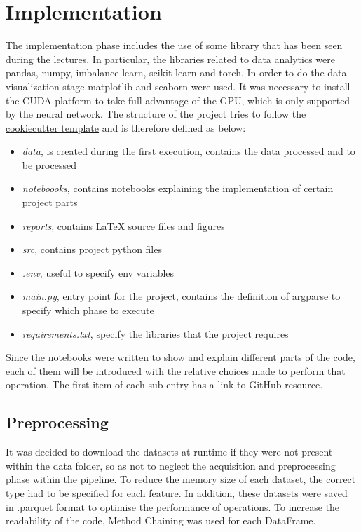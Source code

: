 \documentclass[../main]{subfiles}
\begin{document}
\chapter{Implementation}
The implementation phase includes the use of some library that has been seen during the lectures.
In particular, the libraries related to data analytics were pandas, numpy, imbalance-learn, scikit-learn and torch.
In order to do the data visualization stage matplotlib and seaborn were used.
It was necessary to install the CUDA platform to take full advantage of the GPU, which is only supported by the neural network.
The structure of the project tries to follow the \href{https://cookiecutter.readthedocs.io/en/stable/}{cookiecutter template} and is therefore defined as below:
\begin{itemize}
    \item \textit{data}, is created during the first execution, contains the data processed and to be processed
    \item \textit{noteboooks}, contains notebooks explaining the implementation of certain project parts
    \item \textit{reports}, contains LaTeX source files and figures
    \item \textit{src}, contains project python files
    \item \textit{.env}, useful to specify env variables
    \item \textit{main.py}, entry point for the project, contains the definition of argparse to specify which phase to execute
    \item \textit{requirements.txt}, specify the libraries that the project requires
\end{itemize}
Since the notebooks were written to show and explain different parts of the code, each of them will be introduced with the relative choices made to perform that operation.
The first item of each sub-entry has a link to GitHub resource.

\section{Preprocessing}
It was decided to download the datasets at runtime if they were not present within the data folder, so as not to neglect the acquisition and preprocessing phase within the pipeline.
To reduce the memory size of each dataset, the correct type had to be specified for each feature.
In addition, these datasets were saved in .parquet format to optimise the performance of operations.
To increase the readability of the code, Method Chaining was used for each DataFrame.
\end{document}
